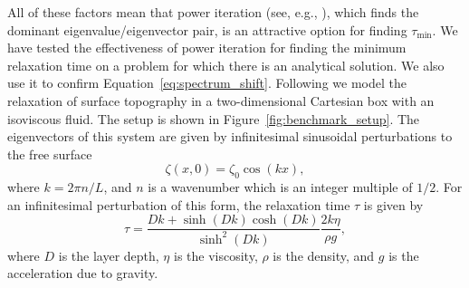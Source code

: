 \documentclass[preprint,12pt,authoryear]{elsarticle}
\begin{document}
All of these factors mean that power iteration (see, e.g., \citet{golub2012matrix}),
which finds the dominant eigenvalue/eigenvector pair, is an attractive option for finding $\tau_\mathrm{min}$.
We have tested the effectiveness of power iteration for finding the minimum relaxation time
on a problem for which there is an analytical solution.
We also use it to confirm Equation~\eqref{eq:spectrum_shift}.
Following \citet{kramer2012implicit} we model the relaxation
of surface topography in a two-dimensional Cartesian box with an isoviscous fluid.
The setup is shown in Figure~\ref{fig:benchmark_setup}.
The eigenvectors of this system are given by infinitesimal sinusoidal perturbations to the free surface
\begin{equation}
\zeta(x,0) = \zeta_0 \cos\left( k x \right),
\label{eq:initial_topography}
\end{equation}
where $k = 2 \pi n / L$, and $n$ is a wavenumber which is an integer multiple of $1/2$.
For an infinitesimal perturbation of this form, the relaxation time $\tau$ is given by
\begin{equation}
\tau = \frac{D k + \sinh(D k) \cosh(D k)}{ \sinh^2 (D k) } \frac{2 k \eta}{\rho g},
\label{eq:analytic_relaxation_time}
\end{equation}
where $D$ is the layer depth, $\eta$ is the viscosity, $\rho$ is the density, and $g$ is the acceleration due to gravity.
\end{document}
